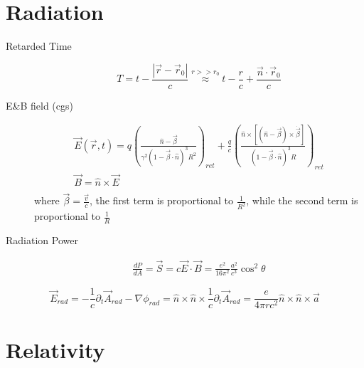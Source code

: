 \section{Radiation}
\begin{description}
    \item [Retarded Time] 
	\begin{equation}
	    \label{eqn:em::retardedTime}
	    T = t-\frac{|\vec{r} - \vec{r}_0|}{c} \stackrel{r>>r_0}{\approx} t - \frac{r}{c} + \frac{\vec{n}\cdot\vec{r}_0}{c}
	\end{equation}


    \item [E\&B field (cgs)]
	\begin{equation}
	    \label{eqn:em::electric_field_cgs}
	    \begin{gathered}
		\vec{E}(\vec{r}, t) = q\left( \frac{\hat{n} - \vec{\beta}}{\gamma^2(1-\vec{\beta}\cdot\hat{n})^3 R^2}\right)_{ret} + \frac{q}{c}\left( \frac{\hat{n} \times [(\hat{n} - \vec{\beta}) \times \dot{\vec{\beta}}]}{(1-\vec{\beta}\cdot\hat{n})^3 R}\right)_{ret}  \\
		\vec{B} = \hat{n} \times \vec{E}    \\
	    \end{gathered}
	\end{equation}
	where $\vec{\beta} = \frac{\vec{v}}{c}$, the first term is 
	proportional to \textbf{$\frac{1}{R^2}$}, while the second term
	is proportional to \textbf{$\frac{1}{R}$}
    \item [Radiation Power]
	\begin{equation}
	    \label{eqn:em::radiationPower}
	    \begin{gathered}
		\frac{dP}{dA} = \vec{S} = c\vec{E}\cdot\vec{B} = \frac{e^2}{16\pi^2}\frac{a^2}{c^3}\cos^2{\theta}
	    \end{gathered}
	\end{equation}
\end{description}

\begin{equation}
    \vec{E}_{rad} = -\frac{1}{c}\partial_t\vec{A}_{rad} - \nabla\phi_{rad} = \hat{n}\times\hat{n}\times\frac{1}{c}\partial_t\vec{A}_{rad}
    = \frac{e}{4\pi r c^2}\hat{n}\times\hat{n}\times\vec{a}
\end{equation}

\section{Relativity}

